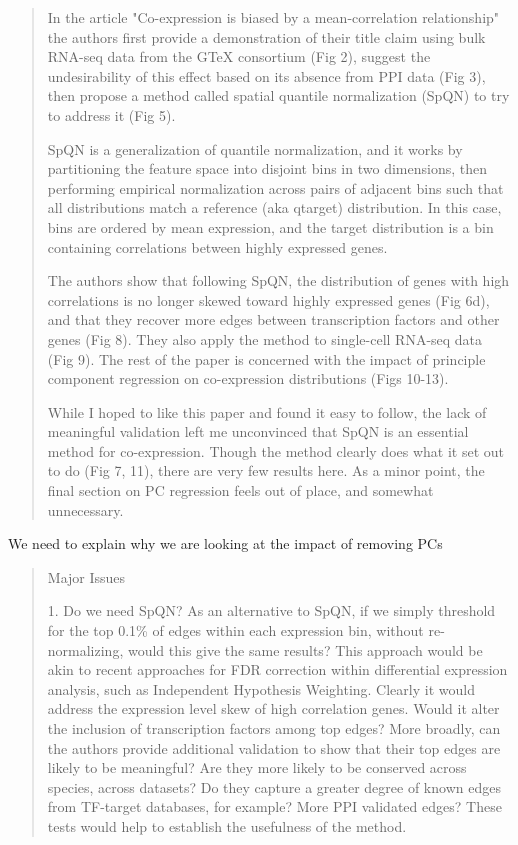 \documentclass[english,letterpaper,pdftex,12pt]{article}
\begin{document}
\begin{quote}
In the article "Co-expression is biased by a mean-correlation relationship" the authors first provide a demonstration of their title claim using bulk RNA-seq data from the GTeX consortium (Fig 2), suggest the undesirability of this effect based on its absence from PPI data (Fig 3), then propose a method called spatial quantile normalization (SpQN) to try to address it (Fig 5). 

SpQN is a generalization of quantile normalization, and it works by partitioning the feature space into disjoint bins in two dimensions, then performing empirical normalization across pairs of adjacent bins such that all distributions match a reference (aka qtarget) distribution. In this case, bins are ordered by mean expression, and the target distribution is a bin containing correlations between highly expressed genes. 

The authors show that following SpQN, the distribution of genes with high correlations is no longer skewed toward highly expressed genes (Fig 6d), and that they recover more edges between transcription factors and other genes (Fig 8). They also apply the method to single-cell RNA-seq data (Fig 9). The rest of the paper is concerned with the impact of principle component regression on co-expression distributions (Figs 10-13). 

While I hoped to like this paper and found it easy to follow, the lack of meaningful validation left me unconvinced that SpQN is an essential method for co-expression. Though the method clearly does what it set out to do (Fig 7, 11), there are very few results here. As a minor point, the final section on PC regression feels out of place, and somewhat unnecessary. 
\end{quote}

\begin{response}
We need to explain why we are looking at the impact of removing PCs


\end{response}  

\begin{quote}
Major Issues

1.  Do we need SpQN? As an alternative to SpQN, if we simply threshold for the top 0.1\% of edges within each expression bin, without re-normalizing, would this give the same results? This approach would be akin to recent approaches for FDR correction within differential expression analysis, such as Independent Hypothesis Weighting. Clearly it would address the expression level skew of high correlation genes. Would it alter the inclusion of transcription factors among top edges? More broadly, can the authors provide additional validation to show that their top edges are likely to be meaningful? Are they more likely to be conserved across species, across datasets? Do they capture a greater degree of known edges from TF-target databases, for example? More PPI validated edges? These tests would help to establish the usefulness of the method.
\end{quote}
\end{document}
